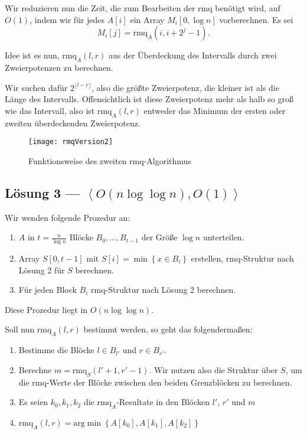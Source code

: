Wir reduzieren nun die Zeit, die zum Bearbeiten der rmq benötigt wird, auf \( O(1) \), indem wir für jedes \( A[i] \) ein Array \( M_i[0,\log n] \) vorberechnen. Es sei
\begin{equation*}
  M_i[j] = \text{rmq}_A(i,i+2^j-1)\text{.}
\end{equation*}

Idee ist es nun, \( \text{rmq}_A(l,r) \) aus der Überdeckung des Intervalls durch zwei Zweierpotenzen zu berechnen.

Wir suchen dafür \( 2^{\lfloor l - r \rfloor} \), also die größte Zweierpotenz, die kleiner ist als die Länge des Intervalls. Offensichtlich ist diese Zweierpotenz mehr als halb so groß wie das Intervall, also ist \( \text{rmq}_A(l,r) \) entweder das Minimum der ersten oder zweiten überdeckenden Zweierpotenz.

\begin{figure}[H]
  \texttt{[image: rmqVersion2]}
  \caption{Funktionsweise des zweiten rmq-Algorithmus}
\end{figure}

\subsection{Lösung 3 --- \( \left\langle O(n \log \log n), O(1) \right\rangle \)}

Wir wenden folgende Prozedur an:

\begin{enumerate}
  \item \( A \) in \( t = \frac{n}{\log n} \) Blöcke \( B_0, \dots, B_{t-1} \) der Größe \( \log n \) unterteilen.
  \item Array \( S[0,t-1] \) mit \( S[i] = \min\left \{ x \in B_i \right \} \) erstellen, rmq-Struktur nach Lösung 2 für \( S \) berechnen.
  \item Für jeden Block \( B_i \) rmq-Struktur nach Lösung 2 berechnen.
\end{enumerate}

Diese Prozedur liegt in \( O(n \log \log n) \).

Soll nun \( \text{rmq}_A(l,r) \) bestimmt werden, so geht das folgendermaßen:

\begin{enumerate}
  \item Bestimme die Blöcke \( l \in B_{l'} \) und \( r \in B_{r'} \).
  \item Berechne \( m = \text{rmq}_S(l'+1, r'-1) \). Wir nutzen also die Struktur über \( S \), um die rmq-Werte der Blöcke zwischen den beiden Grenzblöcken zu berechnen.
  \item Es seien \( k_0,k_1,k_2 \) die \( \text{rmq}_A \)-Resultate in den Blöcken \( l' \), \( r' \) und \( m \)
  \item \( \text{rmq}_A(l,r) = \text{arg}\min \left \{ A[k_0],A[k_1],A[k_2] \right \} \)
\end{enumerate}